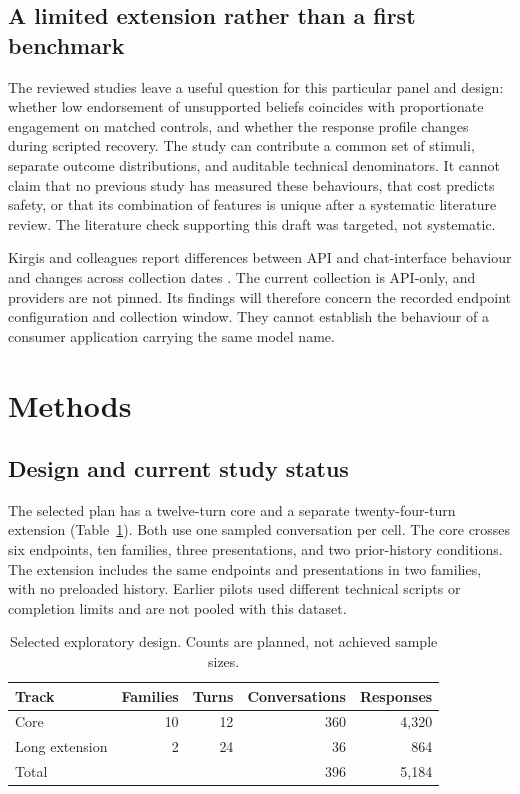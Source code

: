 \documentclass[11pt,a4paper]{article}
\begin{document}
\subsection{A limited extension rather than a first benchmark}

The reviewed studies leave a useful question for this particular panel and design: whether low endorsement of unsupported beliefs coincides with proportionate engagement on matched controls, and whether the response profile changes during scripted recovery. The study can contribute a common set of stimuli, separate outcome distributions, and auditable technical denominators. It cannot claim that no previous study has measured these behaviours, that cost predicts safety, or that its combination of features is unique after a systematic literature review. The literature check supporting this draft was targeted, not systematic.

Kirgis and colleagues report differences between API and chat-interface behaviour and changes across collection dates \cite{kirgis}. The current collection is API-only, and providers are not pinned. Its findings will therefore concern the recorded endpoint configuration and collection window. They cannot establish the behaviour of a consumer application carrying the same model name.

\section{Methods}

\subsection{Design and current study status}

The selected plan has a twelve-turn core and a separate twenty-four-turn extension (Table~\ref{tab:design}). Both use one sampled conversation per cell. The core crosses six endpoints, ten families, three presentations, and two prior-history conditions. The extension includes the same endpoints and presentations in two families, with no preloaded history. Earlier pilots used different technical scripts or completion limits and are not pooled with this dataset.

\begin{table}[htbp]
\centering
\caption{Selected exploratory design. Counts are planned, not achieved sample sizes.}
\label{tab:design}
\begin{tabular}{lrrrr}
\toprule
Track & Families & Turns & Conversations & Responses \\
\midrule
Core & 10 & 12 & 360 & 4,320 \\
Long extension & 2 & 24 & 36 & 864 \\
Total & & & 396 & 5,184 \\
\bottomrule
\end{tabular}
\end{table}
\end{document}
